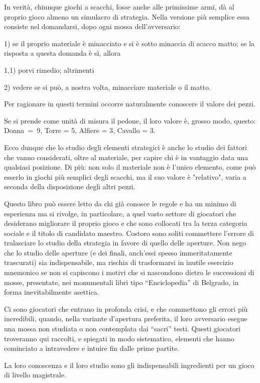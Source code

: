 \documentclass[
]{article}
\begin{document}
In verità, chiunque giochi a scacchi, fosse anche alle primissime armi,
dà al proprio gioco almeno un simulacro di strategia. Nella versione più
semplice essa consiste nel domandarsi, dopo ogni mossa dell'avversario:

1) se il proprio materiale è minacciato e si è sotto minaccia di scacco
matto; se la risposta a questa domanda è sì, allora

1,1) porvi rimedio; altrimenti

2) vedere se si può, a nostra volta, minacciare materiale o il matto.

Per ragionare in questi termini occorre naturalmente conoscere il valore
dei pezzi.

Se si prende come unità di misura il pedone, il loro valore è, grosso
modo, questo: Donna~=~9, Torre = 5, Alfiere = 3, Cavallo = 3.

Ecco dunque che lo studio degli elementi strategici è anche lo studio
dei fattori che vanno considerati, oltre al materiale, per capire chi è
in vantaggio data una qualsiasi posizione. Di più: non solo il materiale
non è l'unico elemento, come può esserlo in giochi più semplici degli
scacchi, ma il suo valore è "relativo", varia a seconda della
disposizione degli altri pezzi.

Questo libro può essere letto da chi già conosce le regole e ha un
minimo di esperienza ma si rivolge, in particolare, a quel vasto settore
di giocatori che desiderano migliorare il proprio gioco e che sono
collocati tra la terza categoria sociale e il titolo di candidato
maestro. Costoro sono soliti commettere l'errore di tralasciare lo
studio della strategia in favore di quello delle aperture. Non nego che
lo studio delle aperture (e dei finali, anch'essi spesso immeritatamente
trascurati) sia indispensabile, ma rischia di trasformarsi in inutile
esercizio mnemonico se non si capiscono i motivi che si nascondono
dietro le successioni di mosse, presentate, nei monumentali libri tipo
``Enciclopedia'' di Belgrado, in forma inevitabilmente asettica.

Ci sono giocatori che entrano in profonda crisi, e che commettono gli
errori più incredibili, quando, nella variante d'apertura preferita, il
loro avversario esegue una mossa non studiata o non contemplata dai
``sacri'' testi. Questi giocatori troveranno qui raccolti, e spiegati in
modo sistematico, elementi che hanno cominciato a intravedere e intuire
fin dalle prime partite.

La loro conoscenza e il loro studio sono gli indispensabili ingredienti
per un gioco di livello magistrale.
\end{document}
